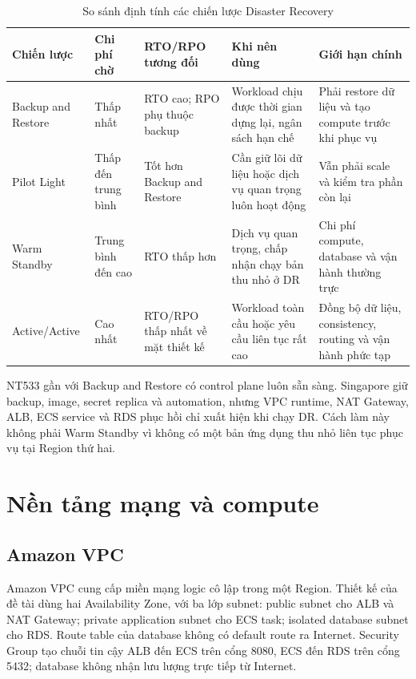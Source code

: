 \begin{table}[H]
\centering
\caption{So sánh định tính các chiến lược Disaster Recovery}
\label{tab:dr-strategies}
\begin{tabularx}{\textwidth}{@{}p{2.7cm}p{2.6cm}p{2.5cm}X X@{}}
\toprule
\textbf{Chiến lược} & \textbf{Chi phí chờ} & \textbf{RTO/RPO tương đối} & \textbf{Khi nên dùng} & \textbf{Giới hạn chính} \\
\midrule
Backup and Restore & Thấp nhất & RTO cao; RPO phụ thuộc backup & Workload chịu được thời gian dựng lại, ngân sách hạn chế & Phải restore dữ liệu và tạo compute trước khi phục vụ \\
Pilot Light & Thấp đến trung bình & Tốt hơn Backup and Restore & Cần giữ lõi dữ liệu hoặc dịch vụ quan trọng luôn hoạt động & Vẫn phải scale và kiểm tra phần còn lại \\
Warm Standby & Trung bình đến cao & RTO thấp hơn & Dịch vụ quan trọng, chấp nhận chạy bản thu nhỏ ở DR & Chi phí compute, database và vận hành thường trực \\
Active/Active & Cao nhất & RTO/RPO thấp nhất về mặt thiết kế & Workload toàn cầu hoặc yêu cầu liên tục rất cao & Đồng bộ dữ liệu, consistency, routing và vận hành phức tạp \\
\bottomrule
\end{tabularx}
\end{table}

NT533 gần với Backup and Restore có control plane luôn sẵn sàng. Singapore giữ backup, image, secret replica và automation, nhưng VPC runtime, NAT Gateway, ALB, ECS service và RDS phục hồi chỉ xuất hiện khi chạy DR. Cách làm này không phải Warm Standby vì không có một bản ứng dụng thu nhỏ liên tục phục vụ tại Region thứ hai.

\section{Nền tảng mạng và compute}

\subsection{Amazon VPC}

Amazon VPC cung cấp miền mạng logic cô lập trong một Region. Thiết kế của đề tài dùng hai Availability Zone, với ba lớp subnet: public subnet cho ALB và NAT Gateway; private application subnet cho ECS task; isolated database subnet cho RDS. Route table của database không có default route ra Internet. Security Group tạo chuỗi tin cậy ALB đến ECS trên cổng 8080, ECS đến RDS trên cổng 5432; database không nhận lưu lượng trực tiếp từ Internet.

